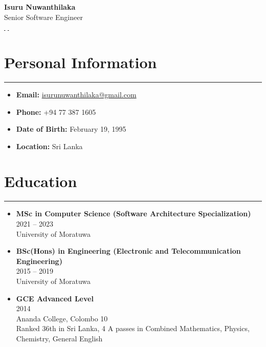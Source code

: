 \documentclass[a4paper,10pt]{article}
\newcommand{\ressection}[1]{\section*{#1}\vspace{-0.5em}\hrule\vspace{0.5em}}
\newenvironment{myitemize}
  {\begin{itemize}[left=0pt,label=,itemsep=5pt]}
  {\end{itemize}}
\begin{document}
\begin{center}
  {\LARGE\bfseries Isuru Nuwanthilaka} \\
  \vspace{0.2em}
  {\Large Senior Software Engineer} \\
  \vspace{0.5em}
  \href{https://www.linkedin.com/in/isurunuwanthilaka}{\faLinkedin \,}
  \href{https://github.com/isurunuwanthilaka}{\faGithub \,}
\end{center}

\ressection{Personal Information}
\begin{myitemize}
    \item \textbf{Email:} \href{mailto:isurunuwanthilaka@gmail.com}{isurunuwanthilaka@gmail.com}
    \item \textbf{Phone:} +94 77 387 1605
    \item \textbf{Date of Birth:} February 19, 1995
    \item \textbf{Location:} Sri Lanka
\end{myitemize}

\ressection{Education}
\begin{myitemize}
    \item \textbf{MSc in Computer Science (Software Architecture Specialization)} \\
          2021 -- 2023 \\
          University of Moratuwa
    \item \textbf{BSc(Hons) in Engineering (Electronic and Telecommunication Engineering)} \\
          2015 -- 2019 \\
          University of Moratuwa
    \item \textbf{GCE Advanced Level} \\
          2014 \\
          Ananda College, Colombo 10 \\
          Ranked 36th in Sri Lanka, 4 A passes in Combined Mathematics, Physics, Chemistry, General English
\end{myitemize}
\end{document}
